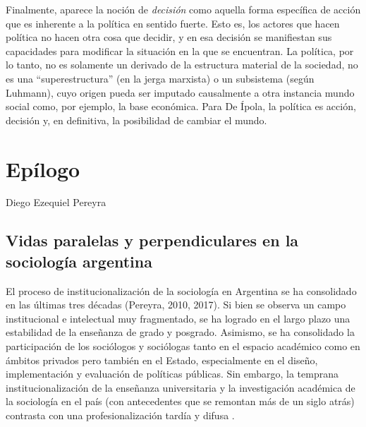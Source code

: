 Finalmente, aparece la noción de \emph{decisión} como aquella forma específica de acción que es inherente a la política en sentido fuerte. Esto es, los actores que hacen política no hacen otra cosa que decidir, y en esa decisión se manifiestan sus capacidades para modificar la situación en la que se encuentran. La política, por lo tanto, no es solamente un derivado de la estructura material de la sociedad, no es una \enquote{superestructura} (en la jerga marxista) o un subsistema (según Luhmann), cuyo origen pueda ser imputado causalmente a otra instancia mundo social como, por ejemplo, la base económica. Para De Ípola, la política es acción, decisión y, en definitiva, la posibilidad de cambiar el mundo.

\backmatter

\chapter[\textbf{Diego Ezequiel Pereyra}\\ Epílogo]{Epílogo}

Diego Ezequiel Pereyra


\section*{Vidas paralelas y perpendiculares en la sociología argentina}

El proceso de institucionalización de la sociología en Argentina se ha consolidado en las últimas tres décadas (Pereyra, 2010, 2017). Si bien se observa un campo institucional e intelectual muy fragmentado, se ha logrado en el largo plazo una estabilidad de la enseñanza de grado y posgrado. Asimismo, se ha consolidado la participación de los sociólogos y sociólogas tanto en el espacio académico como en ámbitos privados pero también en el Estado, especialmente en el diseño, implementación y evaluación de políticas públicas. Sin embargo, la temprana institucionalización de la enseñanza universitaria y la investigación académica de la sociología en el país (con antecedentes que se remontan más de un siglo atrás) contrasta con una profesionalización tardía y difusa \parencite{1512-SHILS1971}.

